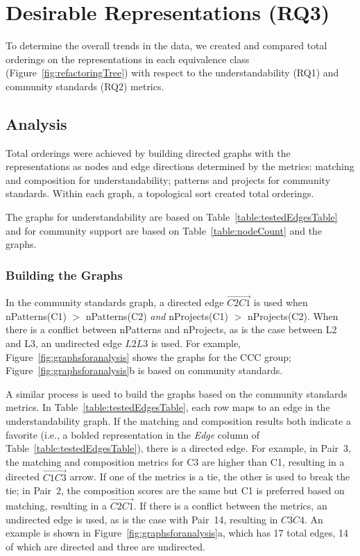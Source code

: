 

\section{Desirable Representations (RQ3)}
\label{sec:rq3}
To determine the overall trends in the data, we created and compared total orderings on the representations in each equivalence class (Figure~\ref{fig:refactoringTree})  with respect to the understandability (RQ1) and community standards (RQ2)   metrics.

\subsection{Analysis}
Total orderings were achieved by building directed graphs with the representations as nodes and edge directions determined by the metrics: matching and composition for understandability;  patterns and projects for community standards. Within each graph, a topological sort created total  orderings.

The graphs for understandability are based on Table~\ref{table:testedEdgesTable} and for community support are based on Table~\ref{table:nodeCount} and the graphs. 



\subsubsection{Building the Graphs}
In the community standards graph, a directed edge  $\overrightarrow{C2  C1}$ is used when  nPatterns(C1) $>$ nPatterns(C2) \emph{and}  nProjects(C1) $>$ nProjects(C2).
When there is a conflict between nPatterns and nProjects, as is the case between L2 and L3, 
an undirected edge $\overline{L2L3}$ is used. %
For example, Figure~\ref{fig:graphsforanalysis} shows the graphs for  the CCC group; Figure~\ref{fig:graphsforanalysis}b is based  on community standards. 

A similar process is used to build the graphs based on the community standards metrics. 
In Table~\ref{table:testedEdgesTable}, each row maps to an edge in the understandability graph. 
If the matching and composition results both indicate a favorite (i.e., a bolded representation in the {\em Edge} column of Table~\ref{table:testedEdgesTable}), there is a directed edge. For example, in Pair~3, the matching and composition metrics for C3 are higher than C1, resulting in a directed $\overrightarrow{C1  C3}$ arrow. If one of the metrics is a tie, the other is used to break the tie; in Pair~2, the composition scores are the same but C1 is preferred based on matching, resulting in a $\overrightarrow{C2  C1}$. If there is a conflict between the metrics, an undirected edge is used, as is the case with Pair~14, resulting in $\overline{C3 C4}$.
An example is shown in Figure~\ref{fig:graphsforanalysis}a, which has 17 total edges, 14 of which are directed and three are undirected. 

